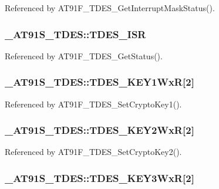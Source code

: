 Referenced by AT91F\_\-TDES\_\-GetInterruptMaskStatus().\hypertarget{struct__AT91S__TDES_3edbcfd3d98eacb37e846486fe2a6625}{
\subsubsection{ {\bf \_\-AT91S\_\-TDES::TDES\_\-ISR}}}
\label{struct__AT91S__TDES_3edbcfd3d98eacb37e846486fe2a6625}




Referenced by AT91F\_\-TDES\_\-GetStatus().\hypertarget{struct__AT91S__TDES_676b746a69e6edc0b99eda688b43b864}{
\subsubsection{ {\bf \_\-AT91S\_\-TDES::TDES\_\-KEY1WxR}\mbox{[}2\mbox{]}}}
\label{struct__AT91S__TDES_676b746a69e6edc0b99eda688b43b864}




Referenced by AT91F\_\-TDES\_\-SetCryptoKey1().\hypertarget{struct__AT91S__TDES_1015610e74e256b2f2ecf3b5913b90e0}{
\subsubsection{ {\bf \_\-AT91S\_\-TDES::TDES\_\-KEY2WxR}\mbox{[}2\mbox{]}}}
\label{struct__AT91S__TDES_1015610e74e256b2f2ecf3b5913b90e0}




Referenced by AT91F\_\-TDES\_\-SetCryptoKey2().\hypertarget{struct__AT91S__TDES_8b345b66cd8daad1734281344c155b66}{
\subsubsection{ {\bf \_\-AT91S\_\-TDES::TDES\_\-KEY3WxR}\mbox{[}2\mbox{]}}}
\label{struct__AT91S__TDES_8b345b66cd8daad1734281344c155b66}




